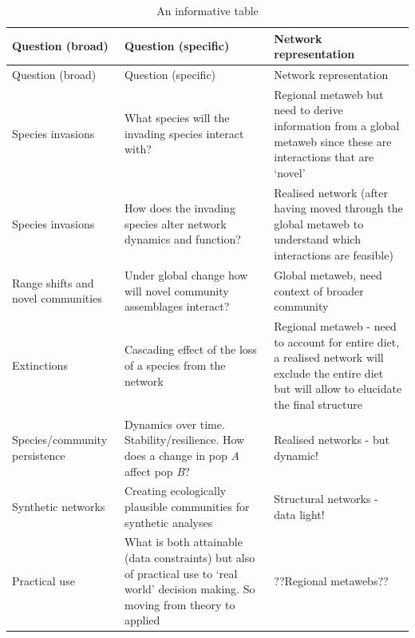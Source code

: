 \documentclass[
]{article}
\begin{document}
\begin{longtable}[]{@{}
  >{\raggedright\arraybackslash}p{}
  >{\raggedright\arraybackslash}p{}
  >{\raggedright\arraybackslash}p{}@{}}
\caption{An informative table}\tabularnewline
\toprule\noalign{}
\begin{minipage}[b]{\linewidth}\raggedright
Question (broad)
\end{minipage} & \begin{minipage}[b]{\linewidth}\raggedright
Question (specific)
\end{minipage} & \begin{minipage}[b]{\linewidth}\raggedright
Network representation
\end{minipage} \\
\midrule\noalign{}
\endfirsthead
\toprule\noalign{}
\begin{minipage}[b]{\linewidth}\raggedright
Question (broad)
\end{minipage} & \begin{minipage}[b]{\linewidth}\raggedright
Question (specific)
\end{minipage} & \begin{minipage}[b]{\linewidth}\raggedright
Network representation
\end{minipage} \\
\midrule\noalign{}
\endhead
\bottomrule\noalign{}
\endlastfoot
Species invasions & What species will the invading species interact
with? & Regional metaweb but need to derive information from a global
metaweb since these are interactions that are `novel' \\
Species invasions & How does the invading species alter network dynamics
and function? & Realised network (after having moved through the global
metaweb to understand which interactions are feasible) \\
Range shifts and novel communities & Under global change how will novel
community assemblages interact? & Global metaweb, need context of
broader community \\
Extinctions & Cascading effect of the loss of a species from the network
& Regional metaweb - need to account for entire diet, a realised network
will exclude the entire diet but will allow to elucidate the final
structure \\
Species/community persistence & Dynamics over time.
Stability/resilience. How does a change in pop \emph{A} affect pop
\emph{B}? & Realised networks - but dynamic! \\
Synthetic networks & Creating ecologically plausible communities for
synthetic analyses & Structural networks - data light! \\
Practical use & What is both attainable (data constraints) but also of
practical use to `real world' decision making. So moving from theory to
applied & ??Regional metawebs?? \\
\end{longtable}
\end{document}
